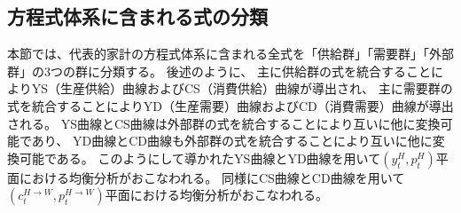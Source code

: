 
\subsection{方程式体系に含まれる式の分類}
\label{sec:chapter5_two_plane_classification}
本節では、代表的家計の方程式体系に含まれる全式を「供給群」「需要群」「外部群」の3つの群に分類する。
後述のように、
主に供給群の式を統合することによりYS（生産供給）曲線およびCS（消費供給）曲線が導出され、
主に需要群の式を統合することによりYD（生産需要）曲線およびCD（消費需要）曲線が導出される。
YS曲線とCS曲線は外部群の式を統合することにより互いに他に変換可能であり、
YD曲線とCD曲線も外部群の式を統合することにより互いに他に変換可能である。
このようにして導かれたYS曲線とYD曲線を用いて\((y_t^H,p_t^H)\)平面における均衡分析がおこなわれる。
同様にCS曲線とCD曲線を用いて\((c_t^{H\to W},p_t^{H\to W})\)平面における均衡分析がおこなわれる。


